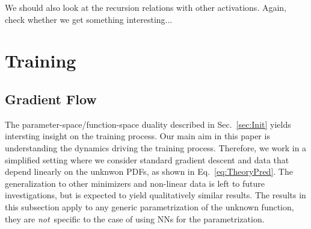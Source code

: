 \documentclass[11pt]{article}
\begin{document}
We should also look at the recursion relations with other activations. Again, check whether we
get something interesting...


\section{Training}
\label{sec:Training}

\subsection{Gradient Flow}
\label{sec:GradFlow}

The parameter-space/function-space duality described in Sec.~\ref{sec:Init} yields intersting insight
on the training process. Our main aim in this paper is understanding the dynamics driving the
training process. Therefore, we work in a simplified setting where we consider standard gradient descent
and data that depend linearly on the unknwon PDFs, as shown in Eq.~\eqref{eq:TheoryPred}. The generalization
to other minimizers and non-linear data is left to future investigations, but is expected to yield
qualitatively similar results. The results
in this subsection apply to any generic parametrization of the unknown function, they are {\em not}\
specific to the case of using NNs for the parametrization.
\end{document}
